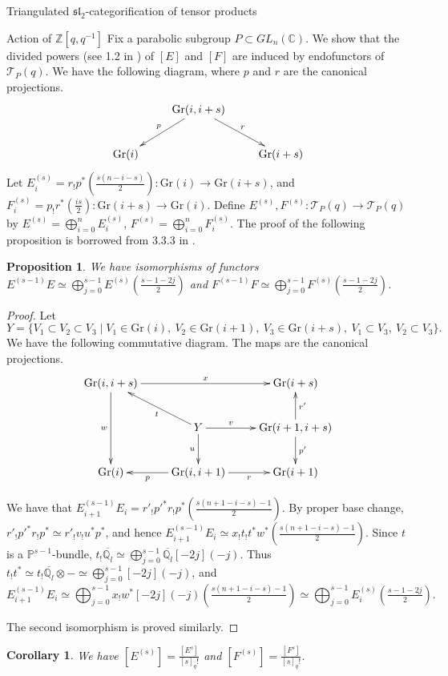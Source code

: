 \documentclass[12pt]{amsart}
\newtheorem{cor}[thm]{Corollary}
\newtheorem{prpn}[thm]{Proposition}
\theoremstyle{definition}
\theoremstyle{remark}
\theoremstyle{remark}
\begin{document}
\begin{section}{Triangulated $\mathfrak{sl}_{2}$-categorification of tensor products}
\begin{subsection}{Action of $\mathbb{Z}[q,q^{-1}]$}
Fix a parabolic subgroup $P \subset GL_{n}(\mathbb{C})$. We show that the divided powers (see 1.2 in \cite{KashiwaraBasesCristallinesDesGroupesQuantiques}) of $[E]$ and $[F]$ are induced by endofunctors of $\mathcal{T}_{P}(q)$. We have the following diagram, where $p$ and $r$ are the canonical projections. \[ \xymatrix{ & \text{Gr}(i,i+s) \ar[dl]_-{p} \ar[dr]^-{r} & \\ \text{Gr}(i) & & \text{Gr}(i+s)} \] Let $E_{i}^{(s)} = r_{!}p^{*}(\frac{s(n-i-s)}{2}) \colon \text{Gr}(i) \rightarrow \text{Gr}(i+s)$, and $F_{i}^{(s)} = p_{!}r^{*}(\frac{is}{2}) \colon \text{Gr}(i+s) \rightarrow \text{Gr}(i)$. Define $E^{(s)},F^{(s)} \colon \mathcal{T}_{P}(q) \rightarrow \mathcal{T}_{P}(q)$ by $E^{(s)} = \bigoplus_{i=0}^{n} E_{i}^{(s)}$, $F^{(s)} = \bigoplus_{i=0}^{n} F_{i}^{(s)}$. The proof of the following proposition is borrowed from 3.3.3 in \cite{ZhengGeometricCategorificationTensorProducts}.

\begin{prpn} \label{F^nDecom} We have isomorphisms of functors $E^{(s-1)}E \simeq \bigoplus_{j=0}^{s-1} E^{(s)} (\tfrac{s-1-2j}{2})$ and $F^{(s-1)}F \simeq \bigoplus_{j=0}^{s-1} F^{(s)} (\tfrac{s-1-2j}{2})$. \end{prpn}

\begin{proof} Let \[ Y = \{ V_{1} \subset V_{2} \subset V_{3} \mid V_{1} \in \text{Gr}(i), \ V_{2} \in \text{Gr}(i+1), \ V_{3} \in \text{Gr}(i+s), \  V_{1} \subset V_{3}, \ V_{2} \subset V_{3} \}. \] We have the following commutative diagram. The maps are the canonical projections. \[ \xymatrix{ \text{Gr}(i,i+s) \ar[rr]^-{x} \ar[dd]_-{w} &  & \text{Gr}(i+s) \\ & Y \ar[ul]^-{t} \ar[r]^-{v} \ar[d]_-{u} & \text{Gr}(i+1,i+s) \ar[u]_-{r'} \ar[d]^-{p'} \\ \text{Gr}(i) & \text{Gr}(i,i+1) \ar[l]^-{p} \ar[r]_-{r} & \text{Gr}(i+1) } \] 

We have that $E_{i+1}^{(s-1)}E_{i} = r'_{!}p'^{*}r_{!}p^{*}(\frac{s(n+1-i-s)-1}{2})$. By proper base change, $r'_{!}p'^{*}r_{!}p^{*} \simeq r'_{!}v_{!}u^{*}p^{*}$, and hence $E_{i+1}^{(s-1)}E_{i} \simeq x_{!}t_{!}t^{*}w^{*}(\frac{s(n+1-i-s)-1}{2})$. Since $t$ is a $\mathbb{P}^{s-1}$-bundle, $t_{!} \overline{\mathbb{Q}_{l}} \simeq \bigoplus_{j=0}^{s-1} \overline{\mathbb{Q}_{l}}[-2j](-j)$. Thus $t_{!}t^{*} \simeq t_{!} \overline{\mathbb{Q}_{l}} \otimes - \simeq  \bigoplus_{j=0}^{s-1} [-2j](-j)$, and \[ E_{i+1}^{(s-1)}E_{i} \simeq \bigoplus_{j=0}^{s-1} x_{!}w^{*}[-2j](-j)(\tfrac{s(n+1-i-s)-1}{2}) \simeq \bigoplus_{j=0}^{s-1} E_{i}^{(s)}(\tfrac{s-1-2j}{2}). \] 

The second isomorphism is proved similarly. 
\end{proof}

\begin{cor} We have $[E^{(s)}] = \frac{[E^{s}]}{[s]_{q}!}$ and $[F^{(s)}] = \frac{[F^{s}]}{[s]_{q}!}$. \end{cor}

\end{subsection}
\end{section}
\end{document}
